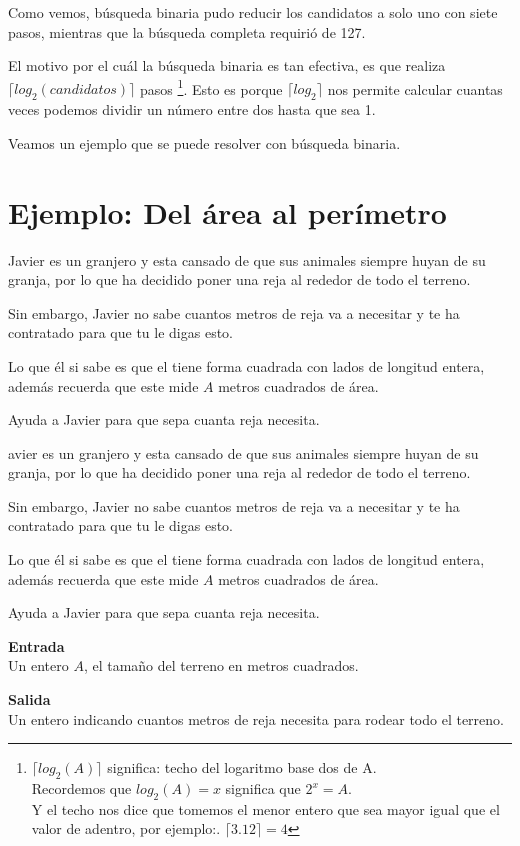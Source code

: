Como vemos, búsqueda binaria pudo reducir los candidatos a solo uno con siete pasos, mientras que la búsqueda completa requirió de 127.

El motivo por el cuál la búsqueda binaria es tan efectiva, es que realiza \(\lceil log_2(candidatos) \rceil\) pasos \footnote{\(\lceil log_2(A) \rceil \) significa: techo del logaritmo base dos de A.\\ Recordemos que \(log_2(A)=x\) significa que \(2^x=A\).\\ Y el techo nos dice que tomemos el menor entero que sea mayor igual que el valor de adentro, por ejemplo:. \(\lceil 3.12 \rceil =4\)}. Esto es porque \(\lceil log_2 \rceil \) nos permite calcular cuantas veces podemos dividir un número entre dos hasta que sea 1.

Veamos un ejemplo que se puede resolver con búsqueda binaria.

\section*{Ejemplo: Del área al perímetro}
Javier es un granjero y esta cansado de que sus animales siempre huyan de su granja, por lo que ha decidido poner una reja al rededor de todo el terreno.

Sin embargo, Javier no sabe cuantos metros de reja va a necesitar y te ha contratado para que tu le digas esto. 

Lo que él si sabe es que el tiene forma cuadrada con lados de longitud entera, además recuerda que este mide \(A\) metros cuadrados de área.

Ayuda a Javier para que sepa cuanta reja necesita.

avier es un granjero y esta cansado de que sus animales siempre huyan de su granja, por lo que ha decidido poner una reja al rededor de todo el terreno.

Sin embargo, Javier no sabe cuantos metros de reja va a necesitar y te ha contratado para que tu le digas esto. 

Lo que él si sabe es que el tiene forma cuadrada con lados de longitud entera, además recuerda que este mide \(A\) metros cuadrados de área.

Ayuda a Javier para que sepa cuanta reja necesita.

\textbf{Entrada}\\
Un entero \(A\), el tamaño del terreno en metros cuadrados.

\textbf{Salida}\\
Un entero indicando cuantos metros de reja necesita para rodear todo el terreno. 

